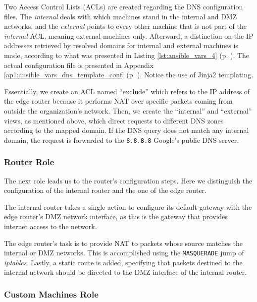Two Access Control Lists (ACLs) are created regarding the DNS configuration files. The \textit{internal} deals with which machines stand in the internal and DMZ networks, and the \textit{external} points to every other machine that is not part of the \textit{internal} ACL, meaning external machines only. Afterward, a distinction on the IP addresses retrieved by resolved domains for internal and external machines is made, according to what was presented in Listing \ref{lst:ansible_vars_4} (p. \pageref{lst:ansible_vars_4}). The actual configuration file is presented in Appendix \ref{ap1:ansible_vars_dns_template_conf} (p. \pageref{ap1:ansible_vars_dns_template_conf}). Notice the use of Jinja2 templating. 

Essentially, we create an ACL named ``exclude'' which refers to the IP address of the edge router because it performs NAT over specific packets coming from outside the organization's network. Then, we create the ``internal'' and ``external'' views, as mentioned above, which direct requests to different DNS zones according to the mapped domain. If the DNS query does not match any internal domain, the request is forwarded to the \texttt{8.8.8.8} Google's public DNS server.

\subsubsection{Router Role} \label{sec:ansible_router_role}

The next role leads us to the router's configuration steps. Here we distinguish the configuration of the internal router and the one of the edge router. 

The internal router takes a single action to configure its default gateway with the edge router's DMZ network interface, as this is the gateway that provides internet access to the network.

The edge router's task is to provide NAT to packets whose source matches the internal or DMZ networks. This is accomplished using the \texttt{MASQUERADE} jump of \textit{iptables}. Lastly, a static route is added, specifying that packets destined to the internal network should be directed to the DMZ interface of the internal router.

\subsubsection{Custom Machines Role} \label{sec:ansible_custom_machines_role}

